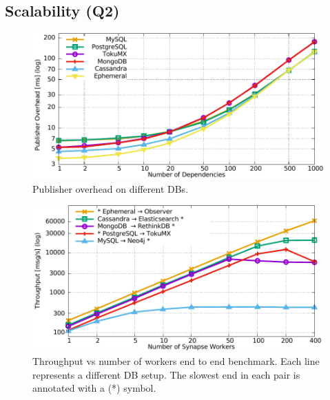 \subsection{Scalability (Q2)}
\label{synapse:sec:evaluation:scalability}

\begin{figure}[]
  \centering
  \includegraphics[width=\linewidth]{figures/synapse/overheadvsdeps.pdf}
  \caption{Publisher overhead on different DBs.}
  \label{synapse:fig:overhead}
\end{figure}


\begin{figure}[]
  \centering
  \includegraphics[width=\linewidth]{figures/synapse/db-throughput-vs-workers.pdf}
  \caption{Throughput vs number of workers end to end benchmark.
      Each line represents a different DB setup.
    The slowest end in each pair is annotated with a (*) symbol.}
    \label{synapse:fig:dbs-throughput}
\end{figure}


